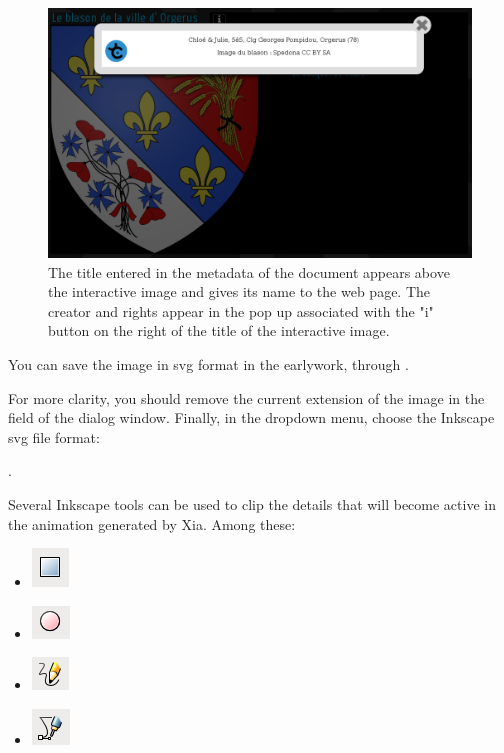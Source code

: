 \begin{figure}[htp]
 \centering
 \includegraphics[width=\textwidth,clip=true,trim=0mm 120mm 55mm 0mm ]{images/titre_ia}
 \caption[How do metadata display in the html5 animation]{The title entered in the metadata of the document appears above 
the interactive image and gives its name to the web page. The creator and 
 rights appear in the pop up associated with the "i" button 
on the right of the title of the interactive image.}
 \label{titre_ia}
\end{figure}

You can save the image in svg format in the earlywork, 
through  .

For more clarity, you should remove the current extension of the image 
in the field  of the dialog window. Finally, in the 
dropdown menu, choose the Inkscape svg file format:

.

Several Inkscape tools can be used to clip the details that
will become active in the animation generated by Xia. Among these:
\begin{itemize}
 \item \includegraphics[scale=0.5]{./images/rec_carre} 
 \item \includegraphics[scale=0.5]{./images/cercles} 
 \item \includegraphics[scale=0.5]{./images/lignes} 
 \item \includegraphics[scale=0.5]{./images/bezier} 
\end{itemize}

